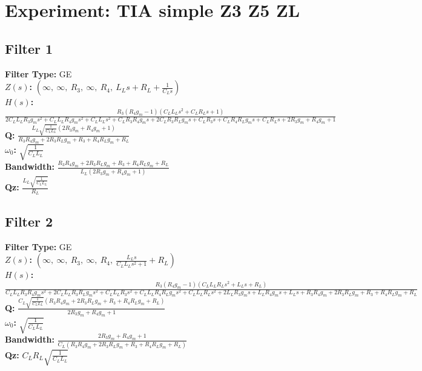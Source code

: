\documentclass{article}
\begin{document}
        \section*{Experiment: TIA simple Z3 Z5 ZL}
\subsection*{Filter 1}
\textbf{Filter Type:} GE \\ 
\textbf{$Z(s)$:} $\left( \infty, \  \infty, \  R_{3}, \  \infty, \  R_{4}, \  L_{L} s + R_{L} + \frac{1}{C_{L} s}\right)$ \\ 
\textbf{$H(s)$:} $\frac{R_{3} \left(R_{4} g_{m} - 1\right) \left(C_{L} L_{L} s^{2} + C_{L} R_{L} s + 1\right)}{2 C_{L} L_{L} R_{3} g_{m} s^{2} + C_{L} L_{L} R_{4} g_{m} s^{2} + C_{L} L_{L} s^{2} + C_{L} R_{3} R_{4} g_{m} s + 2 C_{L} R_{3} R_{L} g_{m} s + C_{L} R_{3} s + C_{L} R_{4} R_{L} g_{m} s + C_{L} R_{L} s + 2 R_{3} g_{m} + R_{4} g_{m} + 1}$ \\ 
\textbf{Q:} $\frac{L_{L} \sqrt{\frac{1}{C_{L} L_{L}}} \left(2 R_{3} g_{m} + R_{4} g_{m} + 1\right)}{R_{3} R_{4} g_{m} + 2 R_{3} R_{L} g_{m} + R_{3} + R_{4} R_{L} g_{m} + R_{L}}$ \\ 
\textbf{$\omega_0$:} $\sqrt{\frac{1}{C_{L} L_{L}}}$ \\ 
\textbf{Bandwidth:} $\frac{R_{3} R_{4} g_{m} + 2 R_{3} R_{L} g_{m} + R_{3} + R_{4} R_{L} g_{m} + R_{L}}{L_{L} \left(2 R_{3} g_{m} + R_{4} g_{m} + 1\right)}$ \\ 
\textbf{Qz:} $\frac{L_{L} \sqrt{\frac{1}{C_{L} L_{L}}}}{R_{L}}$ \\ 
\subsection*{Filter 2}
\textbf{Filter Type:} GE \\ 
\textbf{$Z(s)$:} $\left( \infty, \  \infty, \  R_{3}, \  \infty, \  R_{4}, \  \frac{L_{L} s}{C_{L} L_{L} s^{2} + 1} + R_{L}\right)$ \\ 
\textbf{$H(s)$:} $\frac{R_{3} \left(R_{4} g_{m} - 1\right) \left(C_{L} L_{L} R_{L} s^{2} + L_{L} s + R_{L}\right)}{C_{L} L_{L} R_{3} R_{4} g_{m} s^{2} + 2 C_{L} L_{L} R_{3} R_{L} g_{m} s^{2} + C_{L} L_{L} R_{3} s^{2} + C_{L} L_{L} R_{4} R_{L} g_{m} s^{2} + C_{L} L_{L} R_{L} s^{2} + 2 L_{L} R_{3} g_{m} s + L_{L} R_{4} g_{m} s + L_{L} s + R_{3} R_{4} g_{m} + 2 R_{3} R_{L} g_{m} + R_{3} + R_{4} R_{L} g_{m} + R_{L}}$ \\ 
\textbf{Q:} $\frac{C_{L} \sqrt{\frac{1}{C_{L} L_{L}}} \left(R_{3} R_{4} g_{m} + 2 R_{3} R_{L} g_{m} + R_{3} + R_{4} R_{L} g_{m} + R_{L}\right)}{2 R_{3} g_{m} + R_{4} g_{m} + 1}$ \\ 
\textbf{$\omega_0$:} $\sqrt{\frac{1}{C_{L} L_{L}}}$ \\ 
\textbf{Bandwidth:} $\frac{2 R_{3} g_{m} + R_{4} g_{m} + 1}{C_{L} \left(R_{3} R_{4} g_{m} + 2 R_{3} R_{L} g_{m} + R_{3} + R_{4} R_{L} g_{m} + R_{L}\right)}$ \\ 
\textbf{Qz:} $C_{L} R_{L} \sqrt{\frac{1}{C_{L} L_{L}}}$ \\ 
\end{document}
